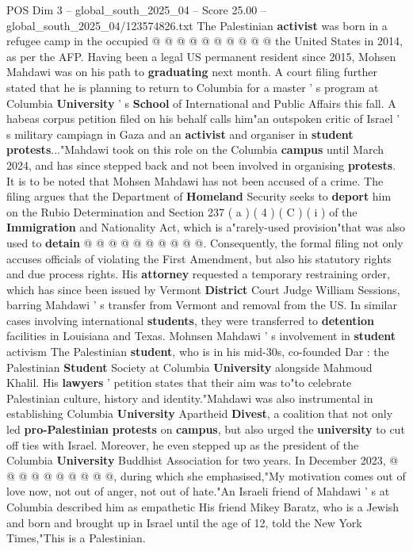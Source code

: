 \begin{textsample}{POS Dim 3 – global\_south\_2025\_04 – Score 25.00 – global\_south\_2025\_04/123574826.txt}
The Palestinian \textbf{activist} was born in a refugee camp in the occupied @ @ @ @ @ @ @ @ @ @ the United States in 2014, as per the AFP.
Having been a legal US permanent resident since 2015, Mohsen Mahdawi was on his path to \textbf{graduating} next month.
A court filing further stated that he is planning to return to Columbia for a master ' s program at Columbia \textbf{University} ' s \textbf{School} of International and Public Affairs this fall.
A habeas corpus petition filed on his behalf calls him"an outspoken critic of Israel ' s military campiagn in Gaza and an \textbf{activist} and organiser in \textbf{student} \textbf{protests}..."Mahdawi took on this role on the Columbia \textbf{campus} until March 2024, and has since stepped back and not been involved in organising \textbf{protests}.
It is to be noted that Mohsen Mahdawi has not been accused of a crime.
The filing argues that the Department of \textbf{Homeland} Security seeks to \textbf{deport} him on the Rubio Determination and Section 237 ( a ) ( 4 ) ( C ) ( i ) of the \textbf{Immigration} and Nationality Act, which is a"rarely-used provision"that was also used to \textbf{detain} @ @ @ @ @ @ @ @ @ @.
Consequently, the formal filing not only accuses officials of violating the First Amendment, but also his statutory rights and due process rights.
His \textbf{attorney} requested a temporary restraining order, which has since been issued by Vermont \textbf{District} Court Judge William Sessions, barring Mahdawi ' s transfer from Vermont and removal from the US.
In similar cases involving international \textbf{students}, they were transferred to \textbf{detention} facilities in Louisiana and Texas.
Mohnsen Mahdawi ' s involvement in \textbf{student} activism The Palestinian \textbf{student}, who is in his mid-30s, co-founded Dar : the Palestinian \textbf{Student} Society at Columbia \textbf{University} alongside Mahmoud Khalil.
His \textbf{lawyers} ' petition states that their aim was to"to celebrate Palestinian culture, history and identity."Mahdawi was also instrumental in establishing Columbia \textbf{University} Apartheid \textbf{Divest}, a coalition that not only led \textbf{pro-Palestinian} \textbf{protests} on \textbf{campus}, but also urged the \textbf{university} to cut off ties with Israel.
Moreover, he even stepped up as the president of the Columbia \textbf{University} Buddhist Association for two years.
In December 2023, @ @ @ @ @ @ @ @ @ @, during which she emphasised,"My motivation comes out of love now, not out of anger, not out of hate."An Israeli friend of Mahdawi ' s at Columbia described him as empathetic His friend Mikey Baratz, who is a Jewish and born and brought up in Israel until the age of 12, told the New York Times,"This is a Palestinian.

\end{textsample}
